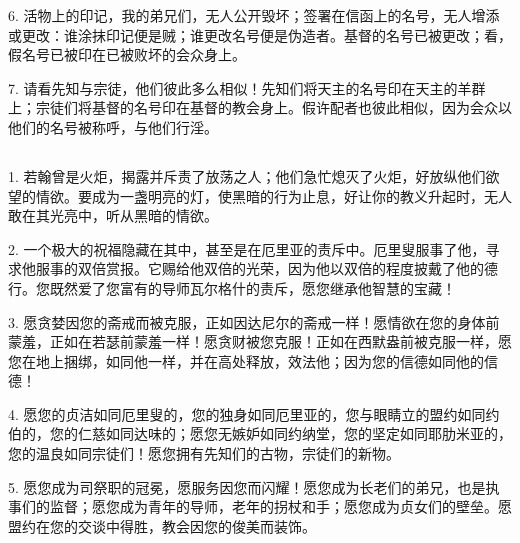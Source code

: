 6. 活物上的印记，我的弟兄们，无人公开毁坏；签署在信函上的名号，无人增添或更改：谁涂抹印记便是贼；谁更改名号便是伪造者。基督的名号已被更改；看，假名号已被印在已被败坏的会众身上。\par

7. 请看先知与宗徒，他们彼此多么相似！先知们将天主的名号印在天主的羊群上；宗徒们将基督的名号印在基督的教会身上。假许配者也彼此相似，因为会众以他们的名号被称呼，与他们行淫。\par


\subsection{}

1. 若翰曾是火炬，揭露并斥责了放荡之人；他们急忙熄灭了火炬，好放纵他们欲望的情欲。要成为一盏明亮的灯，使黑暗的行为止息，好让你的教义升起时，无人敢在其光亮中，听从黑暗的情欲。\par

2. 一个极大的祝福隐藏在其中，甚至是在厄里亚的责斥中。厄里叟服事了他，寻求他服事的双倍赏报。它赐给他双倍的光荣，因为他以双倍的程度披戴了他的德行。您既然爱了您富有的导师瓦尔格什的责斥，愿您继承他智慧的宝藏！\par

3. 愿贪婪因您的斋戒而被克服，正如因达尼尔的斋戒一样！愿情欲在您的身体前蒙羞，正如在若瑟前蒙羞一样！愿贪财被您克服！正如在西默盎前被克服一样，愿您在地上捆绑，如同他一样，并在高处释放，效法他；因为您的信德如同他的信德！\par

4. 愿您的贞洁如同厄里叟的，您的独身如同厄里亚的，您与眼睛立的盟约如同约伯的，您的仁慈如同达味的；愿您无嫉妒如同约纳堂，您的坚定如同耶肋米亚的，您的温良如同宗徒们！愿您拥有先知们的古物，宗徒们的新物。\par

5. 愿您成为司祭职的冠冕，愿服务因您而闪耀！愿您成为长老们的弟兄，也是执事们的监督；愿您成为青年的导师，老年的拐杖和手；愿您成为贞女们的壁垒。愿盟约在您的交谈中得胜，教会因您的俊美而装饰。\par

